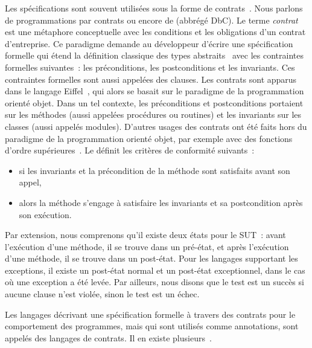 Les spécifications sont souvent utilisées sous la forme de {\strong
contrats}~. Nous parlons de programmations par contrats
ou encore de  (abbrégé DbC). Le terme {\em
contrat} est une métaphore conceptuelle avec les conditions et les obligations
d'un contrat d'entreprise. Ce paradigme demande au développeur d'écrire une
spécification formelle qui étend la définition classique des types
abstraits~ avec les contraintes formelles suivantes~: les
{\strong préconditions}, les {\strong postconditions} et les {\strong
invariants}. Ces contraintes formelles sont aussi appelées des {\strong
clauses}. Les contrats sont apparus dans le langage Eiffel~,
qui alors se basait sur le paradigme de la programmation orienté objet. Dans un
tel contexte, les préconditions et postconditions portaient sur les méthodes
(aussi appelées procédures ou routines) et les invariants sur les classes (aussi
appelés modules). D'autres usages des contrats ont été faits hors du paradigme
de la programmation orienté objet, par exemple avec des fonctions d'ordre
supérieures~. Le  définit les
critères de conformité suivants~:

\begin{itemize}

\item si les invariants et la précondition de la méthode sont satisfaits avant
son appel,

\item alors la méthode s'engage à satisfaire les invariants et sa postcondition
après son exécution.

\end{itemize}

Par extension, nous comprenons qu'il existe deux états pour le SUT~: avant
l'exécution d'une méthode, il se trouve dans un {\strong pré-état}, et après
l'exécution d'une méthode, il se trouve dans un {\strong post-état}. Pour les
langages supportant les exceptions, il existe un post-état normal et un
post-état exceptionnel, dans le cas où une exception a été levée. Par ailleurs,
nous disons que le test est un {\strong succès} si aucune clause n'est violée,
sinon le test est un {\strong échec}.

Les langages décrivant une spécification formelle à travers des contrats pour
le comportement des programmes, mais qui sont utilisés comme annotations, sont
appelés des {\strong langages de contrats}. Il en existe
plusieurs~.

